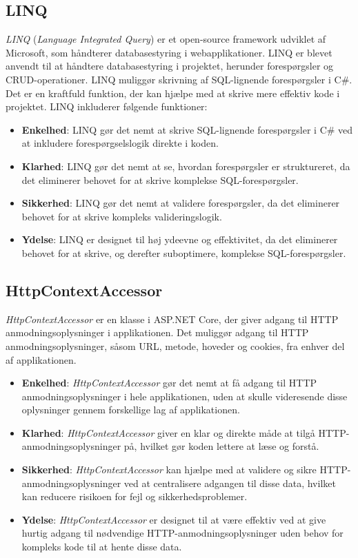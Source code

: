 \subsection{LINQ}
\emph{LINQ} (\emph{Language Integrated Query}) er et open-source framework udviklet af Microsoft, som håndterer databasestyring i webapplikationer. LINQ er blevet anvendt til at håndtere databasestyring i projektet, herunder forespørgsler og CRUD-operationer. LINQ muliggør skrivning af SQL-lignende forespørgsler i C\#. Det er en kraftfuld funktion, der kan hjælpe med at skrive mere effektiv kode i projektet.
LINQ inkluderer følgende funktioner:
\begin{itemize}
\item \textbf{Enkelhed}: LINQ gør det nemt at skrive SQL-lignende forespørgsler i C\# ved at inkludere forespørgselslogik direkte i koden.
\item \textbf{Klarhed}: LINQ gør det nemt at se, hvordan forespørgsler er struktureret, da det eliminerer behovet for at skrive komplekse SQL-forespørgsler.
\item \textbf{Sikkerhed}: LINQ gør det nemt at validere forespørgsler, da det eliminerer behovet for at skrive kompleks valideringslogik.
\item \textbf{Ydelse}: LINQ er designet til høj ydeevne og effektivitet, da det eliminerer behovet for at skrive, og derefter suboptimere, komplekse SQL-forespørgsler.
\end{itemize}

\subsection{HttpContextAccessor}
\emph{HttpContextAccessor} er en klasse i ASP.NET Core, der giver adgang til HTTP anmodningsoplysninger i applikationen. Det muliggør adgang til HTTP anmodningsoplysninger, såsom URL, metode, hoveder og cookies, fra enhver del af applikationen.
\begin{itemize}
\item \textbf{Enkelhed}: \emph{HttpContextAccessor} gør det nemt at få adgang til HTTP anmodningsoplysninger i hele applikationen, uden at skulle videresende disse oplysninger gennem forskellige lag af applikationen.
\item \textbf{Klarhed}: \emph{HttpContextAccessor} giver en klar og direkte måde at tilgå HTTP-anmodningsoplysninger på, hvilket gør koden lettere at læse og forstå.
\item \textbf{Sikkerhed}: \emph{HttpContextAccessor} kan hjælpe med at validere og sikre HTTP-anmodningsoplysninger ved at centralisere adgangen til disse data, hvilket kan reducere risikoen for fejl og sikkerhedsproblemer.
\item \textbf{Ydelse}: \emph{HttpContextAccessor} er designet til at være effektiv ved at give hurtig adgang til nødvendige HTTP-anmodningsoplysninger uden behov for kompleks kode til at hente disse data.
\end{itemize}

